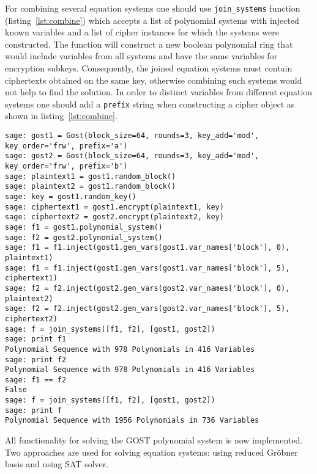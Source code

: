 For combining several equation systems one should use \verb+join_systems+
function (listing~\ref{lst:combine}) which accepts a list of polynomial systems
with injected known variables and a list of cipher instances for which the
systems were constructed. The function will construct a new boolean polynomial
ring that would include variables from all systems and have the same variables
for encryption subkeys. Consequently, the joined equation systems must contain ciphertexts
obtained on the same key, otherwise combining such systems would not help to
find the solution. In order to distinct variables from different equation systems
one should add a \verb+prefix+ string when constructing a cipher object as
shown in listing~\ref{lst:combine}.
\begin{lstlisting}[label=lst:combine, caption=Combining several equation systems]
sage: gost1 = Gost(block_size=64, rounds=3, key_add='mod', key_order='frw', prefix='a')
sage: gost2 = Gost(block_size=64, rounds=3, key_add='mod', key_order='frw', prefix='b')
sage: plaintext1 = gost1.random_block()                                                
sage: plaintext2 = gost1.random_block()                                                
sage: key = gost1.random_key()                                                         
sage: ciphertext1 = gost1.encrypt(plaintext1, key)                                     
sage: ciphertext2 = gost2.encrypt(plaintext2, key)                                     
sage: f1 = gost1.polynomial_system()                                                   
sage: f2 = gost2.polynomial_system()
sage: f1 = f1.inject(gost1.gen_vars(gost1.var_names['block'], 0), plaintext1)          
sage: f1 = f1.inject(gost1.gen_vars(gost1.var_names['block'], 5), ciphertext1)
sage: f2 = f2.inject(gost2.gen_vars(gost2.var_names['block'], 0), plaintext2) 
sage: f2 = f2.inject(gost2.gen_vars(gost2.var_names['block'], 5), ciphertext2)
sage: f = join_systems([f1, f2], [gost1, gost2])
sage: print f1
Polynomial Sequence with 978 Polynomials in 416 Variables
sage: print f2
Polynomial Sequence with 978 Polynomials in 416 Variables
sage: f1 == f2
False
sage: f = join_systems([f1, f2], [gost1, gost2])                                               
sage: print f
Polynomial Sequence with 1956 Polynomials in 736 Variables
\end{lstlisting}


All functionality for solving the GOST polynomial system is now implemented.
Two approaches are used for solving equation systems: using reduced Gr\"obner
basis and using SAT solver. 

